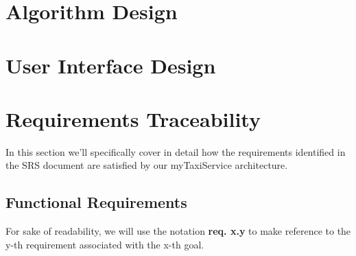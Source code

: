 \chapter{Algorithm Design}

\chapter{User Interface Design}

\chapter{Requirements Traceability}
In this section we'll specifically cover in detail how the requirements identified in the SRS document are satisfied by our myTaxiService architecture. 

\section{Functional Requirements}

For sake of readability, we will use the notation \textbf{req. x.y} to make reference to the y-th requirement associated with the x-th goal.


